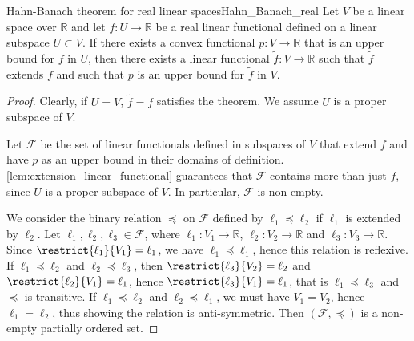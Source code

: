 \begin{theorem}{Hahn-Banach theorem for real linear spaces}{Hahn_Banach_real}
    Let \(V\) be a linear space over \(\mathbb{R}\) and let \(f : U \to \mathbb{R}\) be a real linear functional defined on a linear subspace \(U\subset V\). If there exists a convex functional \(p : V \to \mathbb{R}\) that is an upper bound for \(f\) in \(U\), then there exists a linear functional \(\tilde{f} : V \to \mathbb{R}\) such that \(\tilde{f}\) extends \(f\) and such that \(p\) is an upper bound for \(\tilde{f}\) in \(V\).
\end{theorem}
\begin{proof}
    Clearly, if \(U = V\), \(\tilde{f} = f\) satisfies the theorem. We assume \(U\) is a proper subspace of \(V\).

    Let \(\mathcal{F}\) be the set of linear functionals defined in subspaces of \(V\) that extend \(f\) and have \(p\) as an upper bound in their domains of definition. \cref{lem:extension_linear_functional} guarantees that \(\mathcal{F}\) contains more than just \(f\), since \(U\) is a proper subspace of \(V\). In particular, \(\mathcal{F}\) is non-empty.

    We consider the binary relation \(\preceq\) on \(\mathcal{F}\) defined by \(\ell_1 \preceq \ell_2\) if \(\ell_1\) is extended by \(\ell_2\). Let \(\ell_1, \ell_2, \ell_3 \in \mathcal{F}\), where \(\ell_1 : V_1 \to \mathbb{R}\), \(\ell_2 : V_2 \to \mathbb{R}\) and \(\ell_3 : V_3 \to \mathbb{R}\). Since \(\restrict{\ell_1}{V_1} = \ell_1\), we have \(\ell_1 \preceq \ell_1\), hence this relation is reflexive. If \(\ell_1 \preceq \ell_2\) and \(\ell_2 \preceq \ell_3\), then \(\restrict{\ell_3}{V_2} = \ell_2\) and \(\restrict{\ell_2}{V_1} = \ell_1\), hence \(\restrict{\ell_3}{V_1} = \ell_1\), that is \(\ell_1 \preceq \ell_3\) and \(\preceq\) is transitive. If \(\ell_1 \preceq \ell_2\) and \(\ell_2 \preceq \ell_1\), we must have \(V_1 = V_2\), hence \(\ell_1 = \ell_2\), thus showing the relation is anti-symmetric. Then \((\mathcal{F}, \preceq)\) is a non-empty partially ordered set.


\end{proof}
